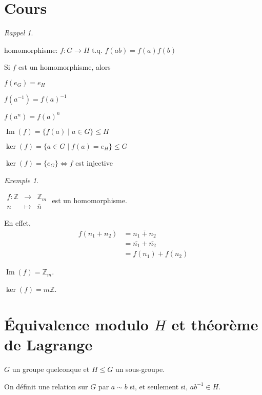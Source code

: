 \documentclass{report}
\newcounter{cours}
\newcommand*{\cours}{\section*{Cours \thecours}\stepcounter{cours}}
\newcommand*{\lte}{\leqslant}
\newcommand*{\entiers}{\mathbb{Z}}
\newcommand*{\image}{\operatorname{Im}}
\theoremstyle{definition}
\theoremstyle{remark}
\newtheorem*{exem}{Exemple}
\newtheorem*{rappel}{Rappel}
\begin{document}
	\cours
	\begin{rappel}~

		\begin{ulist}
			\item homomorphisme: $f:G \to H$ t.q. $f(ab)=f(a)f(b)$
			\item Si $f$ est un homomorphisme, alors
			\begin{ulist}
				\item $f(e_G)=e_H$
				\item $f(a^{-1})=f(a)^{-1}$
				\item $f(a^n)=f(a)^n$
			\end{ulist}
			\item $\image(f) = \{f(a) \mid a \in G\} \lte H$
			\item $\ker(f) = \{a \in G \mid f(a)=e_H\} \lte G$
			\item $\ker(f)=\{e_G\} \Leftrightarrow f$ est injective
		\end{ulist}
	\end{rappel}
	\begin{exem}~

		$\begin{array}{rcl}
			f:\entiers&\to&\entiers_m\\
			n&\mapsto&\overline{n}
		\end{array}$ est un homomorphisme.

		En effet,
		\begin{align*}
			f(n_1+n_2)&= \overline{n_1+n_2}\\
			&= \overline{n_1} + \overline{n_2}\\
			&= f(n_1) + f(n_2)
		\end{align*}

		$\image(f) = \entiers_m$.

		$\ker(f) = m\entiers$.
	\end{exem}

	\section*{\'Equivalence modulo $H$ et th\'eor\`eme de Lagrange}
	$G$ un groupe quelconque et $H \lte G$ un sous-groupe.

	On d\'efinit une relation sur $G$ par $a \sim b$ si, et seulement si, $ab^{-1} \in H$.
\end{document}
